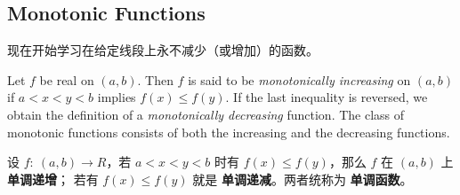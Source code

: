 \documentclass[../poma-notes.tex]{subfiles}
\begin{document}
\subsection*{Monotonic Functions}

现在开始学习在给定线段上永不减少（或增加）的函数。

\begin{definition}
  Let $f$ be real on $(a, b)$. Then $f$ is said to be \textit{monotonically increasing} on $(a, b)$ if
  $a < x < y < b$ implies $f(x) \le f(y)$. If the last inequality is reversed, we obtain the definition of
  a \textit{monotonically decreasing} function. The class of monotonic functions consists of both the
  increasing and the decreasing functions.
\end{definition}

\begin{anote}
  设 $f:\ (a, b) \to R$，若 $a < x < y < b$ 时有 $f(x) \le f(y)$，那么 $f$ 在 $(a, b)$ 上 \textbf{单调递增}；
  若有 $f(x) \le f(y)$ 就是 \textbf{单调递减}。两者统称为 \textbf{单调函数}。
\end{anote}

\end{document}

